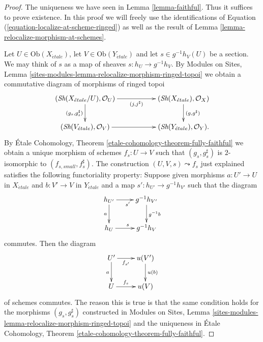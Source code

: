 \begin{proof}
The uniqueness we have seen in
Lemma \ref{lemma-faithful}.
Thus it suffices to prove existence.
In this proof we will freely use the identifications of
Equation (\ref{equation-localize-at-scheme-ringed})
as well as the result of
Lemma \ref{lemma-relocalize-morphism-at-schemes}.

\medskip\noindent
Let $U \in \text{Ob}(X_{\acute{e}tale})$, let
$V \in \text{Ob}(Y_{\acute{e}tale})$
and let $s \in g^{-1}h_V(U)$ be a section. We may think of
$s$ as a map of sheaves $s : h_U \to g^{-1}h_V$. By
Modules on Sites,
Lemma \ref{sites-modules-lemma-relocalize-morphism-ringed-topoi}
we obtain a commutative diagram of morphisms of ringed topoi
$$
\xymatrix{
(\textit{Sh}(X_{\acute{e}tale}/U), \mathcal{O}_U)
\ar[rr]_-{(j, j^\sharp)} \ar[d]_{(g_s, g_s^\sharp)} & &
(\textit{Sh}(X_{\acute{e}tale}), \mathcal{O}_X) \ar[d]^{(g, g^\sharp)} \\
(\textit{Sh}(V_{\acute{e}tale}), \mathcal{O}_V) \ar[rr] & &
(\textit{Sh}(Y_{\acute{e}tale}), \mathcal{O}_Y).
}
$$
By
\'Etale Cohomology, Theorem \ref{etale-cohomology-theorem-fully-faithful}
we obtain a unique morphism of schemes $f_s : U \to V$ such that
$(g_s, g_s^\sharp)$ is $2$-isomorphic to $(f_{s, small}, f_s^\sharp)$.
The construction $(U, V, s) \leadsto f_s$ just explained satisfies
the following functoriality property: Suppose given morphisms
$a : U' \to U$ in $X_{\acute{e}tale}$ and $b : V' \to V$ in $Y_{\acute{e}tale}$
and a map $s' : h_{U'} \to g^{-1}h_{V'}$ such that the diagram
$$
\xymatrix{
h_{U'} \ar[d]_a \ar[r]_{s'} & g^{-1}h_{V'} \ar[d]^{g^{-1}b} \\
h_U \ar[r]^s & g^{-1}h_V
}
$$
commutes. Then the diagram
$$
\xymatrix{
U' \ar[r]_-{f_{s'}} \ar[d]_a & u(V') \ar[d]^{u(b)} \\
U \ar[r]^-{f_s} & u(V)
}
$$
of schemes commutes. The reason this is true is that the same condition
holds for the morphisms $(g_s, g_s^\sharp)$ constructed in
Modules on Sites,
Lemma \ref{sites-modules-lemma-relocalize-morphism-ringed-topoi}
and the uniqueness in
\'Etale Cohomology, Theorem \ref{etale-cohomology-theorem-fully-faithful}.


\end{proof}
